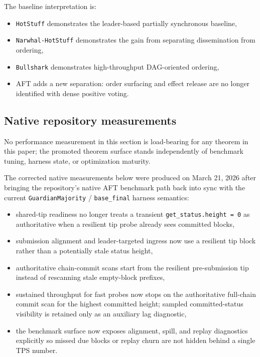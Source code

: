 \documentclass[11pt]{article}
\newcommand{\AFT}{\textsc{AFT}}
\newcommand{\code}[1]{\texttt{#1}}
\begin{document}
The baseline interpretation is:

\begin{itemize}[leftmargin=1.5em]
\item \code{HotStuff} demonstrates the leader-based partially synchronous
baseline,
\item \code{Narwhal-HotStuff} demonstrates the gain from separating
dissemination from ordering,
\item \code{Bullshark} demonstrates high-throughput DAG-oriented ordering,
\item \AFT{} adds a new separation: order surfacing and effect release are no
longer identified with dense positive voting.
\end{itemize}

\subsection{Native repository measurements}

No performance measurement in this section is load-bearing for any theorem in
this paper; the promoted theorem surface stands independently of benchmark
tuning, harness state, or optimization maturity.

The corrected native measurements below were produced on March 21, 2026 after
bringing the repository's native AFT benchmark path back into sync with the
current \code{GuardianMajority} / \code{base\_final} harness semantics:

\begin{itemize}[leftmargin=1.5em]
\item shared-tip readiness no longer treats a transient
\code{get\_status.height = 0} as authoritative when a resilient tip probe
already sees committed blocks,
\item submission alignment and leader-targeted ingress now use a resilient tip
block rather than a potentially stale status height,
\item authoritative chain-commit scans start from the resilient
pre-submission tip instead of rescanning stale empty-block prefixes,
\item sustained throughput for fast probes now stops on the authoritative
full-chain commit scan for the highest committed height; sampled committed-status
visibility is retained only as an auxiliary lag diagnostic,
\item the benchmark surface now exposes alignment, spill, and replay
diagnostics explicitly so missed due blocks or replay churn are not hidden
behind a single TPS number.
\end{itemize}
\end{document}
